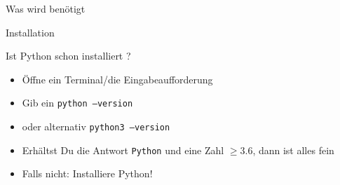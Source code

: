 \documentclass[algorithm,pgfplots,colortheme=dark]{cuzbeamer}
\newcommand{\bash}[1]{\texttt{#1}}
\begin{document}
\begin{frame}{Was wird benötigt}
\end{frame}


\begin{frame}{Installation}

\begin{block}{Ist Python schon installiert ?}
	\begin{itemize}
		\item Öffne ein Terminal/die Eingabeaufforderung
		\item Gib ein \bash{python --version}
		\item oder alternativ \bash{python3 --version}
		\item Erhältst Du die Antwort \bash{Python} und eine Zahl $\geq 3.6$, dann ist alles fein
		\item Falls nicht: Installiere Python!
	\end{itemize}
\end{block}
\end{frame}
\end{document}
